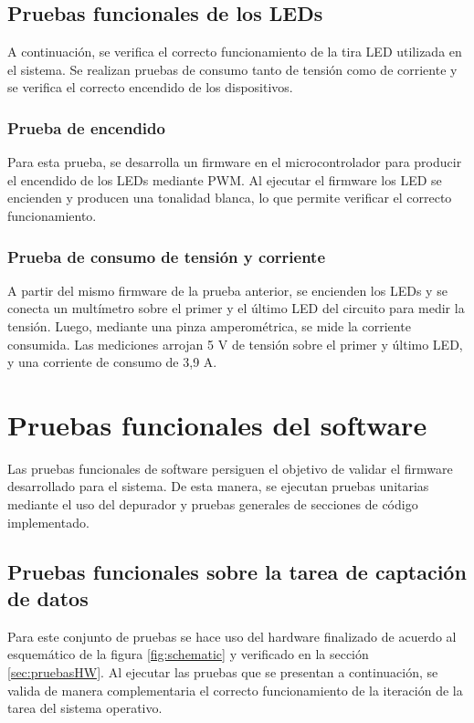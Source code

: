 \subsection{Pruebas funcionales de los LEDs}
\label{sec:pruebaled}
A continuación, se verifica el correcto funcionamiento de la tira LED utilizada en el sistema. Se realizan pruebas de consumo tanto de tensión como de corriente y se verifica el correcto encendido de los dispositivos.
\subsubsection{Prueba de encendido}
Para esta prueba, se desarrolla un firmware en el microcontrolador para producir el encendido de los LEDs mediante PWM. Al ejecutar el firmware los LED se encienden y producen una tonalidad blanca, lo que permite verificar el correcto funcionamiento. 
\subsubsection{Prueba de consumo de tensión y corriente}
A partir del mismo firmware de la prueba anterior, se encienden los LEDs y se conecta un multímetro sobre el primer y el último LED del circuito para medir la tensión. Luego, mediante una pinza amperométrica, se mide la corriente consumida. Las mediciones arrojan 5 V de tensión sobre el primer y último LED, y una corriente de consumo de 3,9 A.

\section{Pruebas funcionales del software}
\label{sec:pruebasSW}
Las pruebas funcionales de software persiguen el objetivo de validar el firmware desarrollado para el sistema. De esta manera, se ejecutan pruebas unitarias mediante el uso del depurador y pruebas generales de secciones de código implementado.

\subsection{Pruebas funcionales sobre la tarea de captación de datos}
Para este conjunto de pruebas se hace uso del hardware finalizado de acuerdo al esquemático de la figura \ref{fig:schematic} y verificado en la sección \ref{sec:pruebasHW}. Al ejecutar las pruebas que se presentan a continuación, se valida de manera complementaria el correcto funcionamiento de la iteración de la tarea del sistema operativo.
